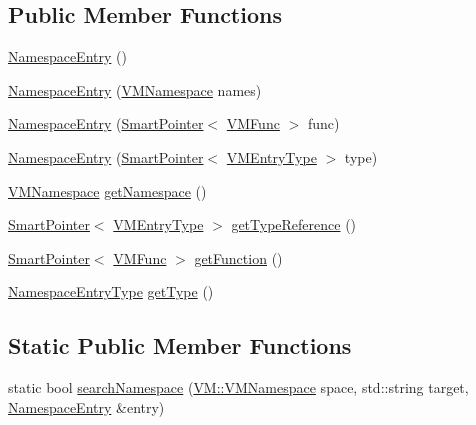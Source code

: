 \subsection*{Public Member Functions}
\begin{DoxyCompactItemize}
\item 
\hyperlink{class_v_m_1_1_namespace_entry_a7b5c4a04249ebaf85455a2820acdad84}{Namespace\-Entry} ()
\item 
\hyperlink{class_v_m_1_1_namespace_entry_ab338e4404b4dcb02f611ba2ea1337fbb}{Namespace\-Entry} (\hyperlink{namespace_v_m_ae5114cdcbed0f8d77a2c87137e08895e}{V\-M\-Namespace} names)
\item 
\hyperlink{class_v_m_1_1_namespace_entry_a1e1c835181f5d45f720065ec37d0bdb4}{Namespace\-Entry} (\hyperlink{_smart_pointer_8hpp_afdd8d4ba81c3fcbdeacf1dafba2accfb}{Smart\-Pointer}$<$ \hyperlink{class_v_m_1_1_v_m_func}{V\-M\-Func} $>$ func)
\item 
\hyperlink{class_v_m_1_1_namespace_entry_a111823c65b9c0be5ff238c9db6211458}{Namespace\-Entry} (\hyperlink{_smart_pointer_8hpp_afdd8d4ba81c3fcbdeacf1dafba2accfb}{Smart\-Pointer}$<$ \hyperlink{class_v_m_1_1_v_m_entry_type}{V\-M\-Entry\-Type} $>$ type)
\item 
\hyperlink{namespace_v_m_ae5114cdcbed0f8d77a2c87137e08895e}{V\-M\-Namespace} \hyperlink{class_v_m_1_1_namespace_entry_af390906637086e7156dc849b0aaa10fe}{get\-Namespace} ()
\item 
\hyperlink{_smart_pointer_8hpp_afdd8d4ba81c3fcbdeacf1dafba2accfb}{Smart\-Pointer}$<$ \hyperlink{class_v_m_1_1_v_m_entry_type}{V\-M\-Entry\-Type} $>$ \hyperlink{class_v_m_1_1_namespace_entry_a64c19caa303f4c34786e32b18b0d3449}{get\-Type\-Reference} ()
\item 
\hyperlink{_smart_pointer_8hpp_afdd8d4ba81c3fcbdeacf1dafba2accfb}{Smart\-Pointer}$<$ \hyperlink{class_v_m_1_1_v_m_func}{V\-M\-Func} $>$ \hyperlink{class_v_m_1_1_namespace_entry_a311e05b9c1133f005a7078c0fafab51b}{get\-Function} ()
\item 
\hyperlink{namespace_v_m_ac5f99b11656e38dd2909b030a7a795c9}{Namespace\-Entry\-Type} \hyperlink{class_v_m_1_1_namespace_entry_a64e7528f2d8403acc86ec3a249a07cf4}{get\-Type} ()
\end{DoxyCompactItemize}
\subsection*{Static Public Member Functions}
\begin{DoxyCompactItemize}
\item 
static bool \hyperlink{class_v_m_1_1_namespace_entry_ad60d6ff4c19fdcd7ed3bf36ff6874bcf}{search\-Namespace} (\hyperlink{namespace_v_m_ae5114cdcbed0f8d77a2c87137e08895e}{V\-M\-::\-V\-M\-Namespace} space, std\-::string target, \hyperlink{class_v_m_1_1_namespace_entry}{Namespace\-Entry} \&entry)
\end{DoxyCompactItemize}


